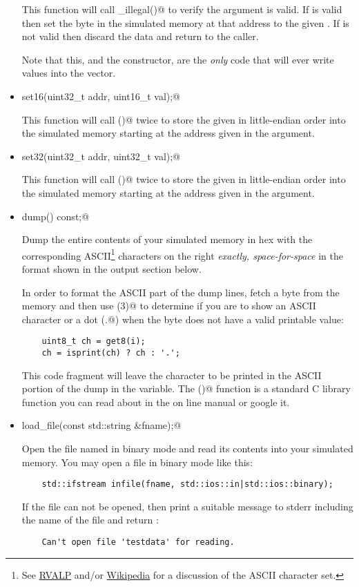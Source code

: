 \documentclass[11pt]{article}
\begin{document}
\begin{itemize}
This function will call \verb@check_illegal()@ to verify the \verb@addr@
argument is valid.
If \verb@addr@ is valid then set the byte in the simulated memory at that
address to the given \verb@val@.
If \verb@addr@ is not valid then discard the data and return to the caller.

Note that this, and the constructor, are the {\em only} code that will ever 
write values into the \verb@mem@ vector.

\item \verb@void set16(uint32_t addr, uint16_t val);@

This function will call ()@ twice to store the given \verb@val@
in little-endian order into the simulated memory starting at the address given in 
the \verb@addr@ argument.

\item \verb@void set32(uint32_t addr, uint32_t val);@

This function will call ()@ twice to store the given \verb@val@
in little-endian order into the simulated memory starting at the address given in 
the \verb@addr@ argument.




\item \verb@void dump() const;@

Dump the entire contents of your simulated memory in hex with the corresponding 
ASCII\footnote{See \href{https://github.com/johnwinans/rvalp}{RVALP} and/or 
\href{https://en.wikipedia.org/wiki/ASCII}{Wikipedia} for a discussion of the ASCII character set.}
characters on the right {\em exactly, space-for-space} in the format shown 
in the output section below.

In order to format the ASCII part of the dump lines, fetch a byte from the memory and 
then use \verb@isprint(3)@ to determine if you are to show an ASCII character or a 
dot (\verb@.@) when the byte does not have a valid printable value:
\begin{verbatim}
    uint8_t ch = get8(i);
    ch = isprint(ch) ? ch : '.';
\end{verbatim}
This code fragment will leave the character to be printed in the ASCII portion
of the dump in the \verb@ch@ variable.
The \verb@isprint()@ function is a standard C library function you can read about in 
the on line manual or google it.

\item \verb@bool load_file(const std::string &fname);@

Open the file named \verb@fname@ in binary mode and read its contents
into your simulated memory.  You may open a file in binary mode like this:
\begin{verbatim}
    std::ifstream infile(fname, std::ios::in|std::ios::binary);
\end{verbatim}
If the file can not be opened, then print a suitable message to stderr 
including the name of the file and return \verb@false@:
\begin{verbatim}
    Can't open file 'testdata' for reading.
\end{verbatim}


\end{itemize}
\end{document}
